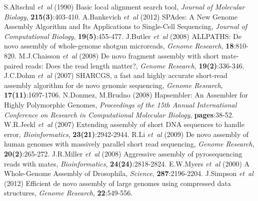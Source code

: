 \documentclass[12pt]{article}
\begin{document}
%
%
%
%
%
%
%
%
%

\newpage
%

%
%
\begin{thebibliography}{}
 S.Altschul {\it et~al} (1990) Basic local alignment search tool, \textit{Journal of Molecular Biology}, {\bf 215(3)}:403-410.
 A.Bankevich {\it et~al} (2012) SPAdes: A New Genome Assembly Algorithm and Its Applications to Single-Cell Sequencing, \textit{Journal of Computational Biology}, {\bf 19(5)}:455-477.
 J.Butler \textit{et~al} (2008) ALLPATHS: De novo assembly of whole-genome shotgun microreads, {\it Genome Research}, {\bf 18}:810-820.
 M.J.Chaisson \textit{et~al} (2008) De novo fragment assembly with short mate-paired reads: Does the read length matter?, \textit{Genome Research}, {\bf 19(2)}:336-346.
 J.C.Dohm \textit{et~al} (2007) SHARCGS, a fast and highly accurate short-read assembly algorithm for de novo genomic sequencing, \textit{Genome Research}, {\bf 17(11)}:1697-1706.
 N.Donmez, M.Brudno (2008) Hapsembler: An Assembler for Highly Polymorphic Genomes, \textit{Proceedings of the 15th Annual International Conference on Research in Computational Molecular Biology}, {\bf pages}:38-52.
 W.R.Jeckl \textit{et~al} (2007) Extending assembly of short DNA sequences to handle error, \textit{Bioinformatics}, {\bf 23(21)}:2942-2944.
 R.Li \textit{et~al} (2009) De novo assembly of human genomes with massively parallel short read sequencing, \textit{Genome Research}, {\bf 20(2)}:265-272.
 J.R.Miller \textit{et~al} (2008) Aggressive assembly of pyrosequencing reads with mates, \textit{Bioinformatics}, {\bf 24(24)}:2818-2824.
 E.W.Myers \textit{et~al} (2000) A Whole-Genome Assembly of Drosophila, \textit{Science}, {\bf 287}:2196-2204.
 J.Simpson \textit{et~al} (2012) Efficient de novo assembly of large genomes using compressed data structures, \textit{Genome Research}, {\bf 22}:549-556.

\end{thebibliography}
\end{document}
